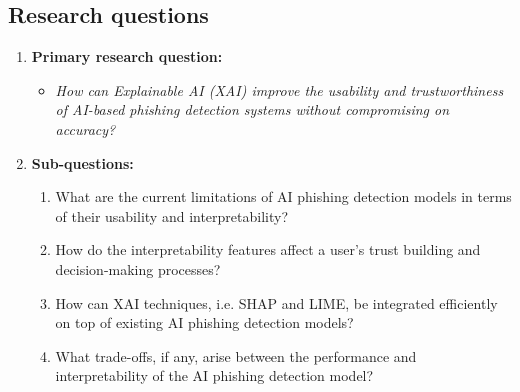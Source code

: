 
\subsection*{Research questions}

\begin{enumerate}
  \item \textbf{Primary research question:}
    \begin{itemize}
      \item \textit{How can Explainable AI (XAI) improve the usability and trustworthiness of AI-based phishing detection systems without compromising on accuracy?}
    \end{itemize}
  \item \textbf{Sub-questions:}
    \begin{enumerate}
      \item What are the current limitations of AI phishing detection models in terms of their usability and interpretability?
      \item How do the interpretability features affect a user's trust building and decision-making processes?
      \item How can XAI techniques, i.e. SHAP and LIME, be integrated efficiently on top of existing AI phishing detection models?
      \item What trade-offs, if any, arise between the performance and interpretability of the AI phishing detection model?
    \end{enumerate}
\end{enumerate}

